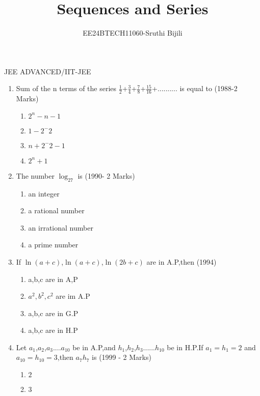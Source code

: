 \documentclass[journal,12pt,twocolumn]{IEEEtran}
\theoremstyle{remark}
\begin{document}

\vspace{3cm}
\title{Sequences and Series}
\author{EE24BTECH11060-Sruthi Bijili}
\maketitle
\newpage
\bigskip
\renewcommand{\thefigure}{\theenumi}
\renewcommand{\thetable}{\theenumi}
JEE ADVANCED/IIT-JEE\\

\begin{enumerate} [start=5]
    \item Sum of the n terms of the series $\frac{1}{2}$+$\frac{3}{4}$+$\frac{7}{8}$+$\frac{15}{16}$+.......... is equal to
    \hfill(1988-2 Marks)
    \begin{enumerate}
        \item $2^n-n-1$
        \item $1-2^-2$
        \item $n+2^-2-1$
        \item $2^n+1$
         \end{enumerate}
    \item  The number $ \log_27$ is
    \hfill(1990- 2 Marks)
    \begin{enumerate}
        \item an integer
        \item a rational number
        \item an irrational number
        \item a prime number
    \end{enumerate}
    \item  If $\ln(a+c)$,$\ln(a+c)$,$\ln(2b+c)$ are in A.P,then
    \hfill(1994)
    \begin{enumerate}
        \item a,b,c are in A,P
        \item $a^2,b^2,c^2$ are im A.P
        \item a,b,c are in G.P
        \item a,b,c are in H.P
    \end{enumerate}
    \item Let $a_{1}$,$a_{2}$,$a_{3}$....$a_{10}$ be in A.P,and $h_{1}$,$h_{2}$,$h_{3}$......$h_{10}$ be in H.P.If $a_{1}$$=$$h_{1}$$=$$2$ and $a_{10}$$=$$h_{10}$$=$$3$,then $a_{7}$$h_{7}$ is
    \hfill(1999 - 2 Marks)
    \begin{enumerate}
        \item $2$
        \item $3$

\end{enumerate}$$
\end{enumerate}
\end{document}
